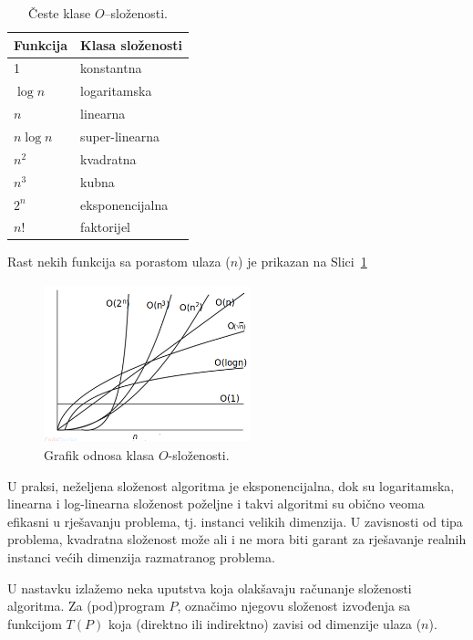  \begin{table}[H]
 	   \caption{Česte klase $O$--složenosti. }  \label{tab:slozenosti_funkcije-a}
 	\centering 
 	\begin{tabular}{l |l} \hline 
 		\textbf{Funkcija}   &  \textbf{Klasa složenosti} \\ \hline
 		1          & konstantna \\
 		$\log n$   & logaritamska \\
 		$n$        &  linearna \\
 		$n \log n$ & super-linearna  \\
 		$n^2$      & kvadratna \\
 		$n^3$      & kubna \\
 		$2^n $     & eksponencijalna \\ 
 		$n!$       & faktorijel \\
 		\hline
  	\end{tabular}

 \end{table}
 Rast nekih funkcija sa porastom ulaza ($n$) je prikazan na Slici~\ref{fig:slozenosti_funkcije-a}
 \begin{figure}[H]
 	\centering
 	\includegraphics[width=170pt,height=130pt]{slike/growth.png}%
   \caption{Grafik odnosa klasa $O$-složenosti.}  \label{fig:slozenosti_funkcije-a}
 \end{figure}


U praksi, neželjena složenost algoritma je eksponencijalna, dok su logaritamska, linearna i log-linearna složenost poželjne i takvi algoritmi su obično veoma efikasni u rješavanju problema, tj. instanci velikih dimenzija. U zavisnosti od tipa problema, kvadratna složenost može ali i ne mora biti garant za rješavanje realnih instanci većih dimenzija razmatranog  problema. %


U nastavku izlažemo neka uputstva koja olakšavaju računanje složenosti algoritma. Za (pod)program $P$, označimo njegovu složenost izvođenja sa funkcijom $T(P)$ koja (direktno ili indirektno) zavisi od dimenzije ulaza ($n$). 
 
